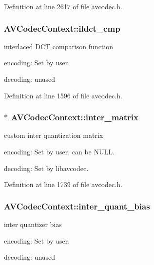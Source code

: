 Definition at line 2617 of file avcodec.\+h.

\subsubsection[{\texorpdfstring{ildct\+\_\+cmp}{ildct_cmp}}]{ A\+V\+Codec\+Context\+::ildct\+\_\+cmp}\hypertarget{struct_a_v_codec_context_aa136d238dbf5ea7085f6117b59e5d5eb}{}\label{struct_a_v_codec_context_aa136d238dbf5ea7085f6117b59e5d5eb}
interlaced D\+CT comparison function
\begin{DoxyItemize}
\item encoding\+: Set by user.
\item decoding\+: unused 
\end{DoxyItemize}

Definition at line 1596 of file avcodec.\+h.

\subsubsection[{\texorpdfstring{inter\+\_\+matrix}{inter_matrix}}]{$\ast$ A\+V\+Codec\+Context\+::inter\+\_\+matrix}\hypertarget{struct_a_v_codec_context_a5eab2273bf713aca6284b8ba06ead659}{}\label{struct_a_v_codec_context_a5eab2273bf713aca6284b8ba06ead659}
custom inter quantization matrix
\begin{DoxyItemize}
\item encoding\+: Set by user, can be N\+U\+LL.
\item decoding\+: Set by libavcodec. 
\end{DoxyItemize}

Definition at line 1739 of file avcodec.\+h.

\subsubsection[{\texorpdfstring{inter\+\_\+quant\+\_\+bias}{inter_quant_bias}}]{ A\+V\+Codec\+Context\+::inter\+\_\+quant\+\_\+bias}\hypertarget{struct_a_v_codec_context_a07a0b83c4bf22c652b494759e6385867}{}\label{struct_a_v_codec_context_a07a0b83c4bf22c652b494759e6385867}
inter quantizer bias
\begin{DoxyItemize}
\item encoding\+: Set by user.
\item decoding\+: unused 
\end{DoxyItemize}

